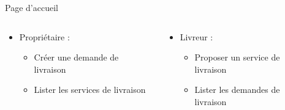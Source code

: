 \documentclass{beamer}
\begin{document}
    \begin{frame}{Page d'accueil}
        \begin{columns}[]
            \begin{column}[t]{.5\linewidth}
                \begin{itemize}[<+- | alert@+>]
                    \item Propriétaire :
                    \begin{itemize}
                        \item Créer une demande de livraison
                        \item Lister les services de livraison
                    \end{itemize}
                \end{itemize}
            \end{column}
            \begin{column}[t]{.5\linewidth}
                \begin{itemize}[<+- | alert@+>]
                    \item Livreur :
                    \begin{itemize}
                        \item Proposer un service de livraison
                        \item Lister les demandes de livraison
                    \end{itemize}
                \end{itemize}
            \end{column}
        \end{columns}
    \end{frame}
\end{document}
